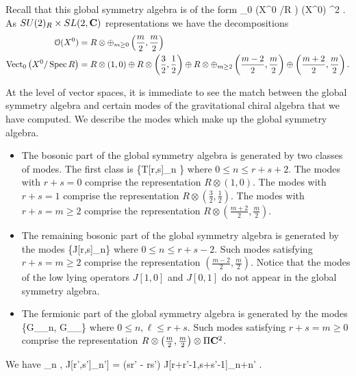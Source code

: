 \documentclass[../main.tex]{subfiles}
\begin{document}
Recall that this global symmetry algebra is of the form
\beqn
{}_0 \left(X^0 \slash \Spec R \right) \oplus \cO(X^0) \otimes \Pi \C^2 .
\eeqn
As $SU(2)_R \times SL(2,\mathbf{C})$ representations we have the decompositions
\begin{align*}
\mathcal O(X^0) & = R \otimes \oplus_{m \geq 0} \left(\frac{m}{2}, \frac{m}{2} \right) \\
\operatorname{Vect}_0 \left(X^0 \slash \operatorname{Spec} R \right) & = R \otimes \left(1,0\right) \oplus R \otimes \left(\frac32, \frac12\right) \oplus R \otimes \oplus_{m \geq 2} \left(\frac{m-2}{2},\frac{m}2\right) \oplus \left(\frac{m+2}{2}, \frac{m}{2}\right) .
\end{align*}

At the level of vector spaces, it is immediate to see the match between the global symmetry algebra and certain modes of the gravitational chiral algebra that we have computed.
We describe the modes which make up the global symmetry algebra.
\begin{itemize}
\item The bosonic part of the global symmetry algebra is generated by two classes of modes.
The first class is
\beqn
\{T[r,s]_n \}
\eeqn
where $0 \leq n \leq r + s + 2$.
The modes with $r + s = 0$ comprise the representation $R \otimes (1,0)$.
The modes with $r + s = 1$ comprise the representation $R \otimes \left(\frac32,\frac12\right)$.
The modes with $r + s = m \geq 2$ comprise the representation $R \otimes \left(\frac{m+2}{2}, \frac{m}{2}\right)$.
\item 
The remaining bosonic part of the global symmetry algebra is generated by the modes
\beqn
\{J[r,s]_n\}
\eeqn
where $0 \leq n \leq r + s - 2$.
Such modes satisfying $r + s = m \geq 2$ comprise the representation $\left(\frac{m-2}{2},\frac{m}2\right)$.
Notice that the modes of the low lying operators $J[1,0]$ and $J[0,1]$ do not appear in the global symmetry algebra.
\item The fermionic part of the global symmetry algebra is generated by the modes
\beqn
\{G_\alpha[r,s]_n, G_\gamma[r,s]_\ell\}
\eeqn
where $0 \leq n,\ell \leq r + s$.
Such modes satisfying $r + s = m \geq 0$ comprise the representation $R \otimes \left(\frac{m}{2}, \frac{m}{2} \right) \otimes \Pi \mathbf{C}^2$.
\end{itemize}

We have
\beqn
[J[r,s]_n , J[r',s']_{n'}] = (sr' - rs') J[r+r'-1,s+s'-1]_{n+n'} .
\eeqn
\end{document}

